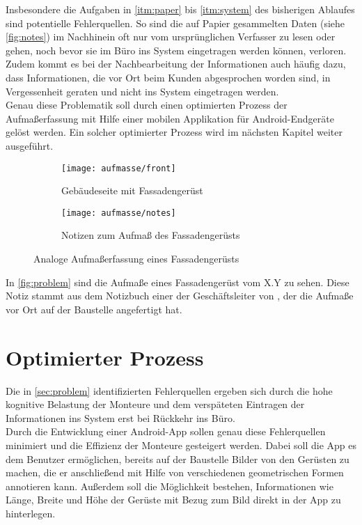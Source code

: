 Insbesondere die Aufgaben in \autoref{itm:paper} bis \autoref{itm:system} des bisherigen Ablaufes sind potentielle Fehlerquellen.
So sind die auf Papier gesammelten Daten (siehe \autoref{fig:notes}) im Nachhinein oft nur vom ursprünglichen Verfasser zu lesen oder gehen, noch bevor sie im Büro ins System eingetragen werden können, verloren.
Zudem kommt es bei der Nachbearbeitung der Informationen auch häufig dazu, dass Informationen, die vor Ort beim Kunden abgesprochen worden sind, in Vergessenheit geraten und nicht ins System eingetragen werden. \\

Genau diese Problematik soll durch einen optimierten Prozess der Aufmaßerfassung mit Hilfe einer mobilen Applikation für Android-Endgeräte gelöst werden.
Ein solcher optimierter Prozess wird im nächsten Kapitel weiter ausgeführt.

\begin{figure}[h]
  \centering
  \begin{subfigure}[t]{0.4\textwidth}
    \texttt{[image: aufmasse/front]}
    \caption{Gebäudeseite mit Fassadengerüst}
  \end{subfigure}
  \begin{subfigure}[t]{0.4\textwidth}
    \texttt{[image: aufmasse/notes]}
    \caption{Notizen zum Aufmaß des Fassadengerüsts}
    \label{fig:notes}
  \end{subfigure}
  \caption{Analoge Aufmaßerfassung eines Fassadengerüsts}
  \label{fig:problem}
\end{figure}

In \autoref{fig:problem} sind die Aufmaße eines Fassadengerüst vom X.Y zu sehen.
Diese Notiz stammt aus dem Notizbuch einer der Geschäftsleiter von \vr{}, der die Aufmaße vor Ort auf der Baustelle angefertigt hat.

\section{Optimierter Prozess}
Die in \autoref{sec:problem} identifizierten Fehlerquellen ergeben sich durch die hohe kognitive Belastung der Monteure und dem verspäteten Eintragen der Informationen ins System erst bei Rückkehr ins Büro. \\

Durch die Entwicklung einer Android-App sollen genau diese Fehlerquellen minimiert und die Effizienz der Monteure gesteigert werden.
Dabei soll die App es dem Benutzer ermöglichen, bereits auf der Baustelle Bilder von den Gerüsten zu machen, die er anschließend mit Hilfe von verschiedenen geometrischen Formen annotieren kann.
Außerdem soll die Möglichkeit bestehen, Informationen wie Länge, Breite und Höhe der Gerüste mit Bezug zum Bild direkt in der App zu hinterlegen. \\

